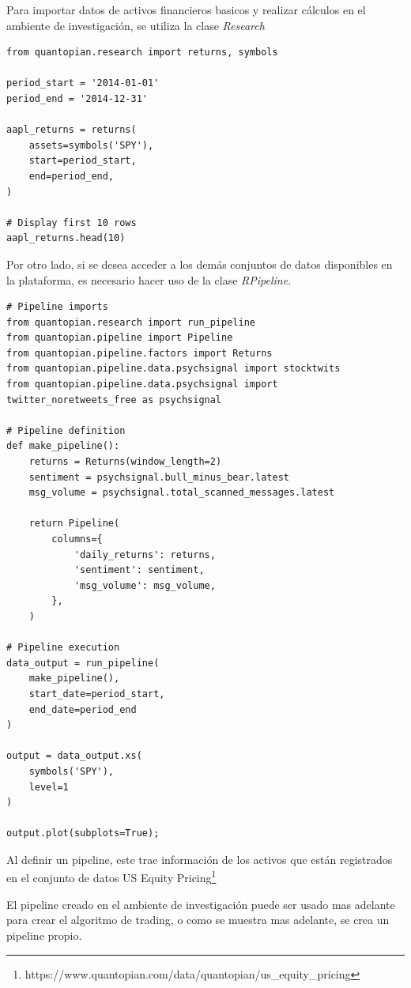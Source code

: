\documentclass[a4paper, 11pt, twocolumn]{article}
\begin{document}
Para importar datos de activos financieros basicos y realizar cálculos en el ambiente de investigación, se utiliza la clase \textit{Research}
\lstset{columns=fullflexible, xleftmargin=1cm, basicstyle=\footnotesize, language=Python, breaklines=true, numbers=left} 
\begin{lstlisting}
from quantopian.research import returns, symbols

period_start = '2014-01-01'
period_end = '2014-12-31'

aapl_returns = returns(
    assets=symbols('SPY'),
    start=period_start,
    end=period_end,
)

# Display first 10 rows
aapl_returns.head(10)
\end{lstlisting}

Por otro lado, si se desea acceder a los demás conjuntos de datos disponibles en la plataforma, es necesario hacer uso de la clase \textit{RPipeline}.

\begin{lstlisting}
# Pipeline imports
from quantopian.research import run_pipeline
from quantopian.pipeline import Pipeline
from quantopian.pipeline.factors import Returns
from quantopian.pipeline.data.psychsignal import stocktwits
from quantopian.pipeline.data.psychsignal import twitter_noretweets_free as psychsignal

# Pipeline definition
def make_pipeline():
    returns = Returns(window_length=2)
    sentiment = psychsignal.bull_minus_bear.latest
    msg_volume = psychsignal.total_scanned_messages.latest

    return Pipeline(
        columns={
            'daily_returns': returns,
            'sentiment': sentiment,
            'msg_volume': msg_volume,
        },
    )

# Pipeline execution
data_output = run_pipeline(
    make_pipeline(),
    start_date=period_start,
    end_date=period_end
)

output = data_output.xs(
    symbols('SPY'),
    level=1
)

output.plot(subplots=True);
\end{lstlisting}

Al definir un pipeline, este trae información de los activos que están registrados en el conjunto de datos US Equity Pricing\footnote{https://www.quantopian.com/data/quantopian/us\_equity\_pricing}

El pipeline creado en el ambiente de investigación puede ser usado mas adelante para crear el algoritmo de trading, o como se muestra mas adelante, se crea un pipeline propio.
\end{document}
